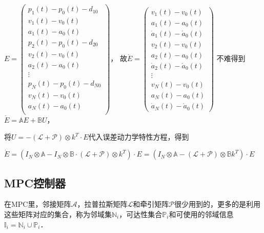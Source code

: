 $E=\begin{pmatrix}
p_{1}(t)-p_{0}(t)-d _{10} \\ v_{1}(t)-v_{0}(t)\\ a_{1}(t)-a_{0}(t)\\ p_{2}(t)-p_{0}(t)-d _{20}\\ v_{2}(t)-v_{0}(t)\\ a_{2}(t)-a_{0}(t)\\
\vdots \\
p_{N}(t)-p_{0}(t)-d _{N0} \\ v_{N}(t)-v_{0}(t) \\ a_{N}(t)-a_{0}(t)  \\
\end{pmatrix}$，
故$\dot{E} =\begin{pmatrix}
v_{1}(t)-v_{0}(t)\\ a_{1}(t)-a_{0}(t)\\\dot{a} _{1}(t)-\dot{a}_{0}(t)\\v_{2}(t)-v_{0}(t)\\a_{2}(t)-a_{0}(t)\\ \dot{a} _{2}(t)-\dot{a}_{0}(t)\\
\vdots \\
v_{N}(t)-v_{0}(t) \\a_{N}(t)-a_{0}(t)  \\\dot{a} _{N}(t)-\dot{a}_{0}(t)
\end{pmatrix}$
不难得到$\dot{E} =\mathbb{A} E+\mathbb{B} U$，

将$U=-(\mathcal{L} +\mathcal{P})\otimes k^T\cdot E$代入误差动力学特性方程，得到

$\dot{E} =(I_{N}\otimes \mathbb{A} -I_{N}\otimes \mathbb{B}\cdot(\mathcal{L} +\mathcal{P})\otimes k^T)\cdot E=(I_{N}\otimes \mathbb{A} -(\mathcal{L} +\mathcal{P})\otimes\mathbb{B}  k^T)\cdot E$
\subsection {MPC控制器}
在MPC里，邻接矩阵$\mathcal{A}$，拉普拉斯矩阵$\mathcal{L}$和牵引矩阵$\mathcal{P}$很少用到的，更多的是利用这些矩阵对应的集合，称为邻域集$\mathbb{N} _{i}$，可达性集合$\mathbb{P} _{i}$和可使用的邻域信息$\mathbb{I} _{i}=\mathbb{N} _{i} \cup  \mathbb{P} _{i}$．
